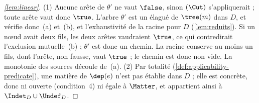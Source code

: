 \begin{proof}[\autoref{lem:linear}]
(1) Aucune arête de \(\theta'\) ne vaut \(\false\), sinon \((\Cut)\)
s'appliquerait ; toute arête vaut donc \(\true\). L'arbre \(\theta'\) est un
élagué de \(\tree(m)\) dans \(D\), et vérifie donc~(a) et~(b), et
l'exhaustivité de la racine pour \(D\) (\autoref{lem:reduits}). Si un nœud
avait deux fils, les deux arêtes vaudraient \(\true\), ce qui contredirait
l'exclusion mutuelle~(b) ; \(\theta'\) est donc un chemin. La racine conserve
au moins un fils, dont l'arête, non fausse, vaut \(\true\) ; le chemin est
donc non vide. La monotonie des sources découle de~(a).
(2) Par totalité (\autoref{def:applicability-predicate}), une matière de
\(\dep(e)\) n'est pas établie dans \(D\) ; elle est concrète, donc ni ouverte
(condition~4) ni égale à \(\Matter\), et appartient ainsi à
\(\Indet_D\cup\Undef_D\).
\end{proof}

